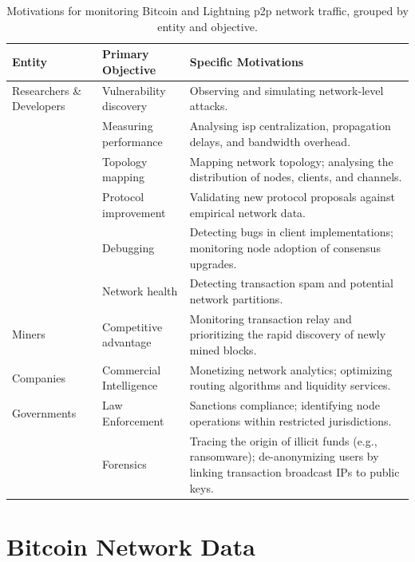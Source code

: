\begin{table}[htpb]
    \centering
    \caption{Motivations for monitoring Bitcoin and Lightning \gls{p2p} network traffic, grouped by entity and objective.}
    \label{tab:motivation-p2p-monitoring}
    \begin{tabularx}{\textwidth}{@{} p{2.5cm} l X @{}}
        \toprule
        \textbf{Entity} & \textbf{Primary Objective} & \textbf{Specific Motivations} \\
        \midrule
        Researchers \newline \& Developers
         & Vulnerability discovery & Observing and simulating network-level attacks. \\
         & Measuring performance & Analysing \gls{isp} centralization, propagation delays, and bandwidth overhead. \\
         & Topology mapping & Mapping network topology; analysing the distribution of nodes, clients, and channels. \\
        & Protocol improvement & Validating new protocol proposals against empirical network data. \\
        & Debugging & Detecting bugs in client implementations; monitoring node adoption of consensus upgrades. \\
        & Network health & Detecting transaction spam and potential network partitions. \\ 
        \addlinespace
       
        Miners & Competitive advantage & Monitoring transaction relay and prioritizing the rapid discovery of newly mined blocks. \\  
        \addlinespace
        
        Companies & Commercial Intelligence & Monetizing network analytics; optimizing routing algorithms and liquidity services. \\
        \addlinespace
        
        Governments & Law Enforcement & Sanctions compliance; identifying node operations within restricted jurisdictions. \\
         & Forensics & Tracing the origin of illicit funds (e.g., ransomware); de-anonymizing users by linking transaction broadcast IPs to public keys. \\
        \bottomrule
    \end{tabularx}
\end{table}


\section{Bitcoin Network Data}

